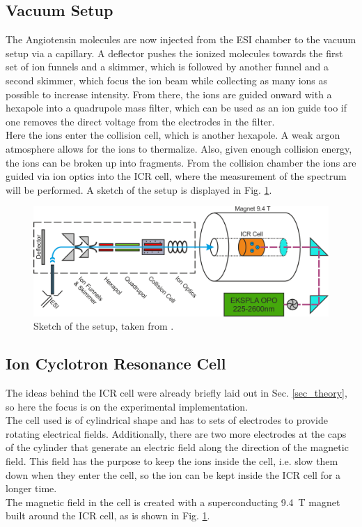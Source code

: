 \documentclass[a4paper,10pt]{article}
\begin{document}
\subsection{Vacuum Setup}
The Angiotensin molecules are now injected from the ESI chamber to the vacuum setup via a capillary. A deflector pushes the ionized molecules towards the first set of ion funnels and a skimmer, which is followed by another funnel and a second skimmer, which focus the ion beam while collecting as many ions as possible to increase intensity. From there, the ions are guided onward with a hexapole into a quadrupole mass filter, which can be used as an ion guide too if one removes the direct voltage from the electrodes in the filter. \\
Here the ions enter the collision cell, which is another hexapole. A weak argon atmosphere allows for the ions to thermalize. Also, given enough collision energy, the ions can be broken up into fragments. From the collision chamber the ions are guided via ion optics into the ICR cell, where the measurement of the spectrum will be performed. A sketch of the setup is displayed in Fig. \ref{fig_setup}. 
\begin{figure}[htp!]
	\centering
	\includegraphics[width= 0.6 \textwidth]{setup.png}
	\caption{Sketch of the setup, taken from \cite{script}.}
	\label{fig_setup}
\end{figure}

\subsection{Ion Cyclotron Resonance Cell}
The ideas behind the ICR cell were already briefly laid out in Sec. \ref{sec_theory}, so here the focus is on the experimental implementation. \\
The cell used is of cylindrical shape and has to sets of electrodes to provide rotating electrical fields. Additionally, there are two more electrodes at the caps of the cylinder that generate an electric field along the direction of the magnetic field. This field has the purpose to keep the ions inside the cell, i.e. slow them down when they enter the cell, so the ion can be kept inside the ICR cell for a longer time. \\
The magnetic field in the cell is created with a superconducting \SI{9.4}{\tesla} magnet built around the ICR cell, as is shown in Fig. \ref{fig_setup}. 
\end{document}
